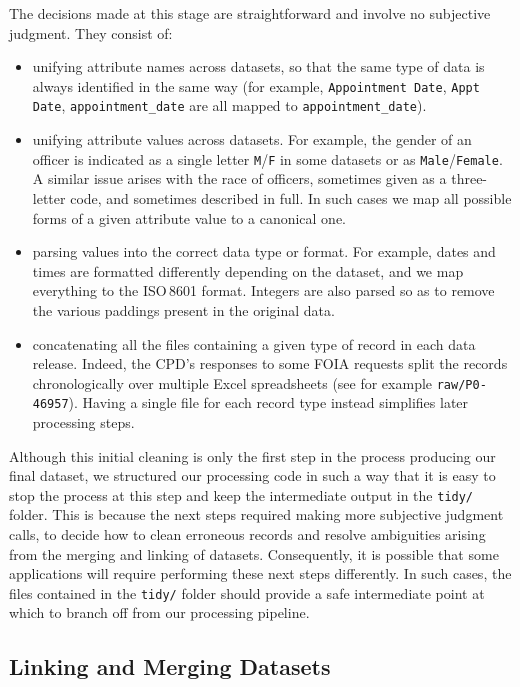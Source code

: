 The decisions made at this stage are straightforward and involve no subjective
judgment. They consist of:
\begin{itemize}
	\item unifying attribute names across datasets, so that the same type of
		data is always identified in the same way (for example,
		\texttt{Appointment Date}, \texttt{Appt Date},
		\texttt{appointment\_date} are all mapped to
		\texttt{appointment\_date}).
	\item unifying attribute values across datasets. For example, the gender of
		an officer is indicated as a single letter \texttt{M}/\texttt{F} in
		some datasets or as \texttt{Male}/\texttt{Female}. A similar issue
		arises with the race of officers, sometimes given as a three-letter
		code, and sometimes described in full. In such cases we map all
		possible forms of a given attribute value to a canonical one.
	\item parsing values into the correct data type or format. For example,
		dates and times are formatted differently depending on the dataset, and
		we map everything to the ISO\,8601 format. Integers are also parsed so
		as to remove the various paddings present in the original data.
	\item concatenating all the files containing a given type of record in each
		data release. Indeed, the CPD's responses to some FOIA requests split
		the records chronologically over multiple Excel spreadsheets (see for
		example \texttt{raw/P0-46957}). Having a single file for each record
		type instead simplifies later processing steps.
\end{itemize}

Although this initial cleaning is only the first step in the process producing
our final dataset, we structured our processing code in such a way that it is
easy to stop the process at this step and keep the intermediate output in the
\texttt{tidy/} folder. This is because the next steps required making more
subjective judgment calls, to decide how to clean erroneous records and resolve
ambiguities arising from the merging and linking of datasets. Consequently, it
is possible that some applications will require performing these next steps
differently. In such cases, the files contained in the \texttt{tidy/} folder
should provide a safe intermediate point at which to branch off from our
processing pipeline.

\subsection{Linking and Merging Datasets}\label{sec:linking}

